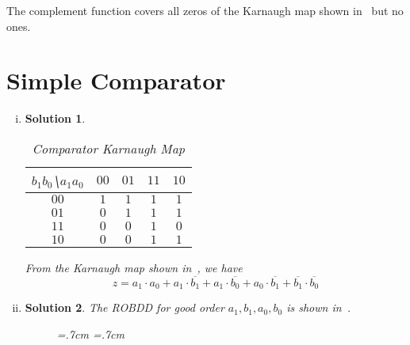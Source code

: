 \documentclass[acmlarge,screen=true,anonymous=false,11pt]{acmart}
\newtheorem*{solution*}{Solution}
\begin{document}
\begin{enumerate}[(i)]
The complement function covers all zeros of the Karnaugh map shown in~ but no ones.
\end{enumerate}

\section{Simple Comparator}
\begin{enumerate}[(i)]
    \item \begin{solution*}
        \begin{table}
            \caption{Comparator Karnaugh Map}
            \label{tb:3}
            \begin{tabular}{c|cccc}
                $b_1 b_0$\textbackslash$a_1 a_0$ & $00$ & $01$ & $11$ & $10$ \\\midrule
                $00$ & $1$ & $1$ & $1$ & $1$\\
                $01$ & $0$ & $1$ & $1$ & $1$\\
                $11$ & $0$ & $0$ & $1$ & $0$\\
                $10$ & $0$ & $0$ & $1$ & $1$
            \end{tabular}
        \end{table}

From the Karnaugh map shown in~, we have \begin{equation}
    z = a_1 \cdot a_0 + a_1 \cdot \overline{b_1} + a_1 \cdot \overline{b_0} + a_0 \cdot \overline{b_1} + \overline{b_1} \cdot \overline{b_0}
\end{equation}
    \end{solution*}

\item \begin{solution*}
    The ROBDD for good order $a_1, b_1, a_0, b_0$ is shown in~.
\begin{figure}
    \newdimen\nodeDist
    \nodeDist=.7cm
    \newdimen\nodeSize
    \nodeSize=.7cm
\end{figure}
\end{solution*}
\end{enumerate}
\end{document}
